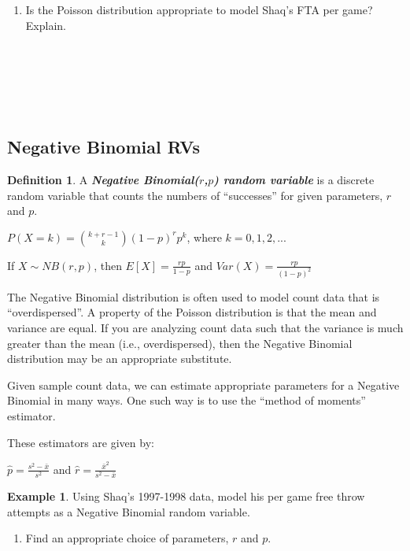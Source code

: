 \documentclass[
  11pt,
]{book}
\providecommand{\tightlist}{%
  \setlength{\itemsep}{0pt}\setlength{\parskip}{0pt}}
\theoremstyle{definition}
\newtheorem{definition}{Definition}[chapter]
\theoremstyle{definition}
\newtheorem{example}{Example}[chapter]
\theoremstyle{definition}
\theoremstyle{definition}
\theoremstyle{remark}
\begin{document}
\begin{enumerate}
\def\labelenumi{(\alph{enumi})}
\setcounter{enumi}{6}
\tightlist
\item
  Is the Poisson distribution appropriate to model Shaq's FTA per game? Explain.\\
  \strut \\
  \strut \\
  \strut \\
\end{enumerate}

\newpage

\hypertarget{negative-binomial-rvs}{%
\subsection{Negative Binomial RVs}\label{negative-binomial-rvs}}

\begin{definition}
A \textbf{\emph{Negative Binomial(\(r\),\(p\)) random variable}} is a discrete random variable that counts the numbers of ``successes'' for given parameters, \(r\) and \(p\).

\(P(X=k) = {k+r-1 \choose k}(1-p)^rp^k\), where \(k = 0, 1, 2, ...\)

If \(X \sim NB(r,p)\), then \(E[X]=\frac{rp}{1-p}\) and \(Var(X)=\frac{rp}{(1-p)^2}\)
\end{definition}

The Negative Binomial distribution is often used to model count data that is ``overdispersed''. A property of the Poisson distribution is that the mean and variance are equal. If you are analyzing count data such that the variance is much greater than the mean (i.e., overdispersed), then the Negative Binomial distribution may be an appropriate substitute.

Given sample count data, we can estimate appropriate parameters for a Negative Binomial in many ways. One such way is to use the ``method of moments'' estimator.

These estimators are given by:

\(\hat{p} = \frac{s^2-\bar{x}}{s^2}\) and \(\hat{r} = \frac{\bar{x}^2}{s^2-\bar{x}}\)

\begin{example}
Using Shaq's 1997-1998 data, model his per game free throw attempts as a Negative Binomial random variable.
\end{example}

\begin{enumerate}
\def\labelenumi{(\alph{enumi})}
\tightlist
\item
  Find an appropriate choice of parameters, \(r\) and \(p\).
\end{enumerate}
\end{document}

